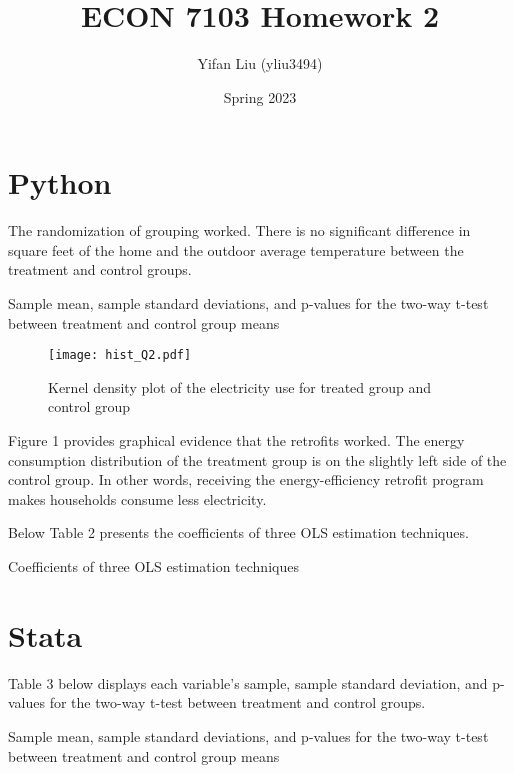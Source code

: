 \documentclass{article}
\title{ECON 7103 Homework 2}
\author{Yifan Liu (yliu3494)}
\date{Spring 2023}
\begin{document}
  
\maketitle




\section{Python}
The randomization of grouping worked. There is no significant difference in square feet of the home and the outdoor average temperature between the treatment and control groups.

\begin{table}[hbt!]
    \centering
    
    \caption{Sample mean, sample standard deviations, and p-values for the two-way t-test between treatment and control group means}
    \label{tab:table_Q1}
\end{table}


\begin{figure}[hbt!]
    \centering
    \texttt{[image: hist\_Q2.pdf]}
    \caption{Kernel density plot of the electricity use for treated group and control group}
    \label{fig:hist_Q2}
\end{figure}

Figure 1 provides graphical evidence that the retrofits worked. The energy consumption distribution of the treatment group is on the slightly left side of the control group. In other words, receiving the energy-efficiency retrofit program makes households consume less electricity. 

\hspace{1cm}

Below Table 2 presents the coefficients of three OLS estimation techniques.

\begin{table}[hbt!]
    \centering
    
    \caption{Coefficients of three OLS estimation techniques}
    \label{tab: table_Q3}
\end{table}


\section{Stata}

Table 3 below displays each variable's sample, sample standard deviation, and p-values for the two-way t-test between treatment and control groups.

\begin{table}[hbt!]
    \centering
    
    \caption{Sample mean, sample standard deviations, and p-values for the two-way t-test between treatment and control group means}
    \label{tab:stata_Q1}
\end{table}
\end{document}

